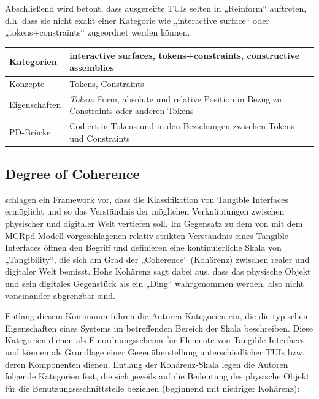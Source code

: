 Abschließend wird betont, dass ausgereifte \glspl{TUI} selten in „Reinform“ auftreten, d.h. dass sie nicht exakt einer Kategorie wie „interactive surface“ oder „tokens+constraints“ zugeordnet werden können. 
\\[1em]
\begin{tabular}{| p{3cm} | p{10cm} |}
  \hline
  Kategorien & interactive surfaces, tokens+constraints, constructive assemblies \\ \hline
  Konzepte & Tokens, Constraints \\ \hline
  Eigenschaften & \emph{Token}: Form, absolute und relative Position in Bezug zu Constraints oder anderen Tokens \\ \hline
  PD-Brücke & Codiert in Tokens und in den Beziehungen zwischen Tokens und Constraints \\ \hline
\end{tabular} 


\subsection{Degree of Coherence} %
\label{sub:degree_of_coherence}
\citet{Koleva03} schlagen ein Framework vor, dass die Klassifikation von Tangible Interfaces ermöglicht und so das Verständnis der möglichen Verknüpfungen zwischen physischer und digitaler Welt vertiefen soll. Im Gegensatz zu dem von \citet{Ullmer00} mit dem MCRpd-Modell vorgeschlagenen relativ strikten Verständnis eines Tangible Interfaces öffnen \citeauthor{Koleva03} den Begriff und definieren eine kontinuierliche Skala von „Tangibility“, die sich am Grad der „Coherence“ (Kohärenz) zwischen realer und digitaler Welt bemisst. Hohe Kohärenz sagt dabei aus, dass das physische Objekt und sein digitales Gegenstück als ein „Ding“ wahrgenommen werden, also nicht voneinander abgrenzbar sind.

Entlang diesem Kontinuum führen die Autoren Kategorien ein, die die typischen Eigenschaften eines Systems im betreffenden Bereich der Skala beschreiben. Diese Kategorien dienen als Einordnungsschema für Elemente von Tangible Interfaces und können als Grundlage einer Gegenüberstellung unterschiedlicher \glspl{TUI} bzw. deren Komponenten dienen. Entlang der Kohärenz-Skala legen die Autoren folgende Kategorien fest, die sich jeweils auf die Bedeutung des physische Objekt für die Benutzungssschnittstelle beziehen (beginnend mit niedriger Kohärenz): 

